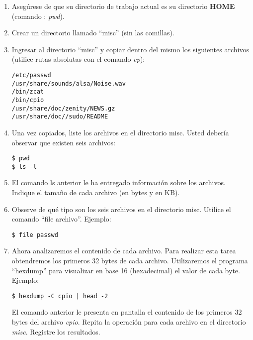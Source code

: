 \documentclass[12pt]{article}
\begin{document}
\begin{enumerate}

    \item Asegúrese de que su directorio de trabajo actual es su directorio
        \textbf{HOME} (comando : \emph{pwd}).

    \item Crear un directorio llamado ``misc'' (sin las comillas).

    \item Ingresar al directorio ``misc'' y copiar dentro del mismo los
        siguientes archivos (utilice rutas absolutas con el comando \emph{cp}):

\begin{verbatim}
/etc/passwd
/usr/share/sounds/alsa/Noise.wav
/bin/zcat
/bin/cpio
/usr/share/doc/zenity/NEWS.gz
/usr/share/doc//sudo/README
\end{verbatim}

    \item Una vez copiados, liste los archivos en el directorio misc. Usted
        debería observar que existen seis archivos:

        \begin{verbatim}
$ pwd 
$ ls -l
        \end{verbatim}

    \item El comando ls anterior le ha entregado información sobre los
        archivos.  Indique el tamaño de cada archivo (en bytes y en KB).

    \item Observe de qué tipo son los seis archivos en el directorio misc.
        Utilice el comando ``file archivo''. Ejemplo:

        \begin{verbatim}
$ file passwd
        \end{verbatim}

    \item Ahora analizaremos el contenido de cada archivo. Para realizar esta
        tarea obtendremos los primeros 32 bytes de cada archivo. Utilizaremos
        el programa ``hexdump'' para visualizar en base 16 (hexadecimal) el
        valor de cada byte. Ejemplo:

        \begin{verbatim}
$ hexdump -C cpio | head -2
        \end{verbatim}

        El comando anterior le presenta en pantalla el contenido de los
        primeros 32 bytes del archivo \emph{cpio}. Repita la operación para
        cada archivo en el directorio \emph{misc}. Registre los resultados.


\end{enumerate}
\end{document}
